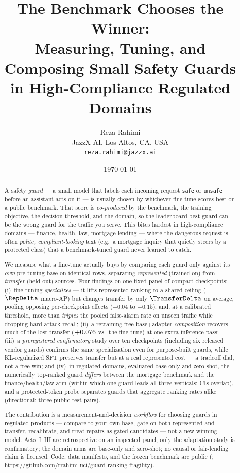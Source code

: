\documentclass[11pt]{article}
\title{\textbf{The Benchmark Chooses the Winner:}\\[3pt]
\large Measuring, Tuning, and Composing Small Safety Guards\\
in High-Compliance Regulated Domains}
\author{Reza Rahimi\\\small JazzX AI, Los Altos, CA, USA \\ \small\texttt{reza.rahimi@jazzx.ai}}
\date{\today}
\newcommand{\code}[1]{\texttt{\small #1}}
\begin{document}
\maketitle


\begin{abstract}
\noindent A safety \emph{guard} --- a small model that labels each incoming request \code{safe} or
\code{unsafe} before an assistant acts on it --- is usually chosen by whichever fine-tune scores best on a
public benchmark. That score is \emph{co-produced} by the benchmark, the training objective, the decision
threshold, and the domain, so the leaderboard-best guard can be the wrong guard for the traffic you serve.
This bites hardest in high-compliance domains --- finance, health, law, mortgage lending --- where the
dangerous request is often \emph{polite, compliant-looking} text (e.g.\ a mortgage inquiry that quietly
steers by a protected class) that a benchmark-tuned guard never learned to catch.

\smallskip
\noindent We measure what a fine-tune actually buys by comparing each guard only against its \emph{own}
pre-tuning base on identical rows, separating \emph{represented} (trained-on) from \emph{transfer}
(held-out) sources. Four findings on one fixed panel of compact checkpoints: (i)~fine-tuning
\emph{specializes} --- it lifts represented ranking to a shared ceiling ($\RepDelta$ macro-AP) but changes
transfer by only $\TransferDelta$ on average, pooling opposing per-checkpoint effects ($+0.04$ to $-0.15$),
and, at a calibrated threshold, more than \emph{triples} the pooled
false-alarm rate on unseen traffic while dropping hard-attack recall; (ii)~a retraining-free
base$+$adapter \emph{composition} recovers much of the lost transfer ($+0.076$ vs.\ the
fine-tune) at one extra inference pass; (iii)~a \emph{preregistered confirmatory} study over ten
checkpoints (including six released vendor guards) confirms the same specialization even for
purpose-built guards, while KL-regularized
SFT preserves transfer but at a real represented cost --- a tradeoff dial, not a free win; and (iv)~in
regulated domains, evaluated base-only and zero-shot, the numerically top-ranked guard \emph{differs}
between the mortgage benchmark and the finance/health/law arm (within which one guard leads all three
verticals; CIs overlap), and a protected-token probe separates guards that aggregate ranking rates
alike (directional; three public-test pairs).

\smallskip
\noindent The contribution is a measurement-and-decision \emph{workflow} for choosing guards in regulated
products --- compare to your own base, gate on both represented and transfer, recalibrate, and treat
repairs as gated candidates --- not a new winning model. Acts~I--III are retrospective on an inspected
panel; only the adaptation study is confirmatory; the domain arms are base-only and zero-shot; no causal
or fair-lending claim is licensed. Code, data manifests, and the frozen benchmark are public
(; \url{https://github.com/rrahimi-uci/guard-ranking-fragility}).
\end{abstract}
\end{document}
